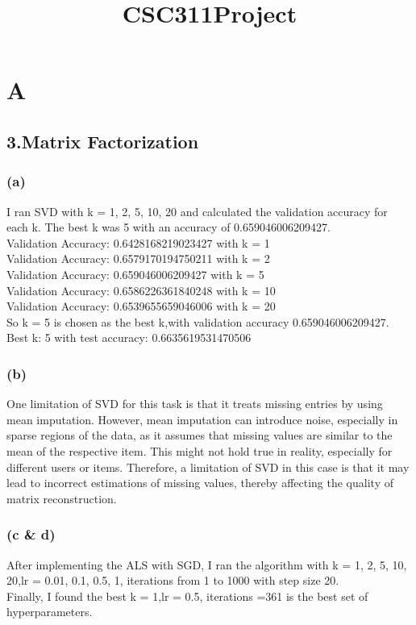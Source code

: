 \documentclass{article}
\title{CSC311Project}
\begin{document}
\maketitle



\section*{A}
\subsection*{3.Matrix Factorization}
\subsubsection*{(a)}
I ran SVD with k = 1, 2, 5, 10, 20 and calculated the validation accuracy for each k. The best k was 5 with an accuracy of 0.659046006209427.\\
Validation Accuracy: 0.6428168219023427 with k = 1\\
Validation Accuracy: 0.6579170194750211 with k = 2\\
Validation Accuracy: 0.659046006209427 with k = 5\\
Validation Accuracy: 0.6586226361840248 with k = 10\\
Validation Accuracy: 0.6539655659046006 with k = 20\\
So k = 5 is chosen as the best k,with validation accuracy 0.659046006209427.\\
Best k: 5 with test accuracy: 0.6635619531470506\\

\subsubsection*{(b)}
One limitation of SVD for this task is that it treats missing entries by using mean imputation. However,
mean imputation can introduce noise, especially in sparse regions of the data, as it assumes that missing values are similar
to the mean of the respective item. This might not hold true in reality, especially for different users or items. Therefore,
a limitation of SVD in this case is that it may lead to incorrect estimations of missing values, thereby affecting the quality
of matrix reconstruction.


\subsubsection*{(c & d)}
After implementing the ALS with SGD, I ran the algorithm with k = 1, 2, 5, 10, 20,lr = 0.01, 0.1, 0.5, 1, iterations from 1 to 1000 with step size 20.\\
Finally, I found the best k = 1,lr = 0.5, iterations =361 is the best set of hyperparameters.\\
\end{document}
